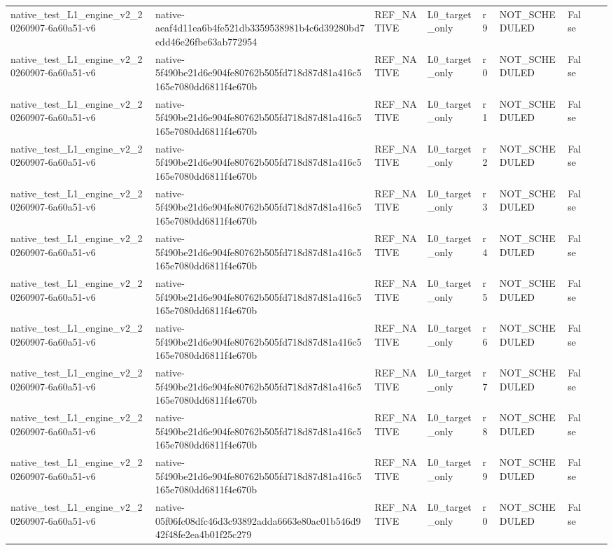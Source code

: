 \begin{tabular}{lllllllll}
native\_test\_L1\_engine\_v2\_20260907-6a60a51-v6 & native-aeaf4d11ea6b4fe521db3359538981b4c6d39280bd7edd46e26fbe63ab772954 & REF\_NATIVE & L0\_target\_only & r9 & NOT\_SCHEDULED & False &  &  \\
native\_test\_L1\_engine\_v2\_20260907-6a60a51-v6 & native-5f490be21d6e904fe80762b505fd718d87d81a416c5165e7080dd6811f4e670b & REF\_NATIVE & L0\_target\_only & r0 & NOT\_SCHEDULED & False &  &  \\
native\_test\_L1\_engine\_v2\_20260907-6a60a51-v6 & native-5f490be21d6e904fe80762b505fd718d87d81a416c5165e7080dd6811f4e670b & REF\_NATIVE & L0\_target\_only & r1 & NOT\_SCHEDULED & False &  &  \\
native\_test\_L1\_engine\_v2\_20260907-6a60a51-v6 & native-5f490be21d6e904fe80762b505fd718d87d81a416c5165e7080dd6811f4e670b & REF\_NATIVE & L0\_target\_only & r2 & NOT\_SCHEDULED & False &  &  \\
native\_test\_L1\_engine\_v2\_20260907-6a60a51-v6 & native-5f490be21d6e904fe80762b505fd718d87d81a416c5165e7080dd6811f4e670b & REF\_NATIVE & L0\_target\_only & r3 & NOT\_SCHEDULED & False &  &  \\
native\_test\_L1\_engine\_v2\_20260907-6a60a51-v6 & native-5f490be21d6e904fe80762b505fd718d87d81a416c5165e7080dd6811f4e670b & REF\_NATIVE & L0\_target\_only & r4 & NOT\_SCHEDULED & False &  &  \\
native\_test\_L1\_engine\_v2\_20260907-6a60a51-v6 & native-5f490be21d6e904fe80762b505fd718d87d81a416c5165e7080dd6811f4e670b & REF\_NATIVE & L0\_target\_only & r5 & NOT\_SCHEDULED & False &  &  \\
native\_test\_L1\_engine\_v2\_20260907-6a60a51-v6 & native-5f490be21d6e904fe80762b505fd718d87d81a416c5165e7080dd6811f4e670b & REF\_NATIVE & L0\_target\_only & r6 & NOT\_SCHEDULED & False &  &  \\
native\_test\_L1\_engine\_v2\_20260907-6a60a51-v6 & native-5f490be21d6e904fe80762b505fd718d87d81a416c5165e7080dd6811f4e670b & REF\_NATIVE & L0\_target\_only & r7 & NOT\_SCHEDULED & False &  &  \\
native\_test\_L1\_engine\_v2\_20260907-6a60a51-v6 & native-5f490be21d6e904fe80762b505fd718d87d81a416c5165e7080dd6811f4e670b & REF\_NATIVE & L0\_target\_only & r8 & NOT\_SCHEDULED & False &  &  \\
native\_test\_L1\_engine\_v2\_20260907-6a60a51-v6 & native-5f490be21d6e904fe80762b505fd718d87d81a416c5165e7080dd6811f4e670b & REF\_NATIVE & L0\_target\_only & r9 & NOT\_SCHEDULED & False &  &  \\
native\_test\_L1\_engine\_v2\_20260907-6a60a51-v6 & native-05f06fc08dfc46d3c93892adda6663e80ac01b546d942f48fe2ea4b01f25c279 & REF\_NATIVE & L0\_target\_only & r0 & NOT\_SCHEDULED & False &  &  \\

\end{tabular}
